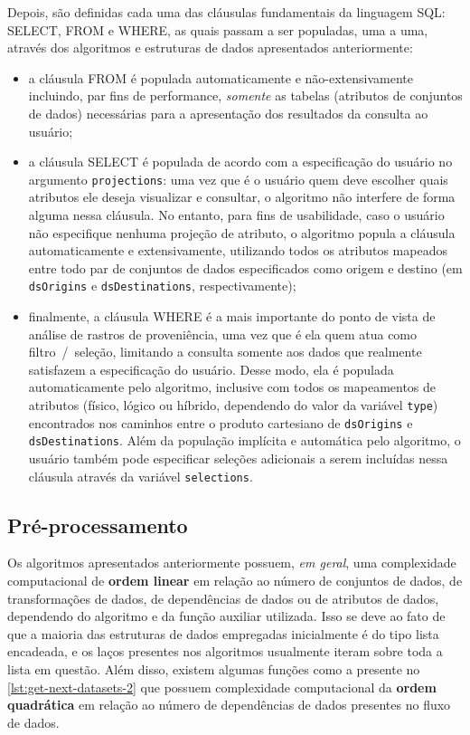 Depois, são definidas cada uma das cláusulas fundamentais da linguagem SQL: \textsc{SELECT}, \textsc{FROM} e \textsc{WHERE}, as quais passam a ser populadas, uma a uma, através dos algoritmos e estruturas de dados apresentados anteriormente:

\begin{itemize}
    \item a cláusula \textsc{FROM} é populada automaticamente e não-extensivamente incluindo, par fins de performance, \emph{somente} as tabelas (atributos de conjuntos de dados) necessárias para a apresentação dos resultados da consulta ao usuário;
    \item a cláusula \textsc{SELECT} é populada de acordo com a especificação do usuário no argumento \texttt{projections}: uma vez que é o usuário quem deve escolher quais atributos ele deseja visualizar e consultar, o algoritmo não interfere de forma alguma nessa cláusula. No entanto, para fins de usabilidade, caso o usuário não especifique nenhuma projeção de atributo, o algoritmo popula a cláusula automaticamente e extensivamente, utilizando todos os atributos mapeados entre todo par de conjuntos de dados especificados como origem e destino (em \texttt{dsOrigins} e \texttt{dsDestinations}, respectivamente);
    \item finalmente, a cláusula \textsc{WHERE} é a mais importante do ponto de vista de análise de rastros de proveniência, uma vez que é ela quem atua como filtro~/~seleção, limitando a consulta somente aos dados que realmente satisfazem a especificação do usuário. Desse modo, ela é populada automaticamente pelo algoritmo, inclusive com todos os mapeamentos de atributos (físico, lógico ou híbrido, dependendo do valor da variável \texttt{type}) encontrados nos caminhos entre o produto cartesiano de \texttt{dsOrigins} e \texttt{dsDestinations}. Além da população implícita e automática pelo algoritmo, o usuário também pode especificar seleções adicionais a serem incluídas nessa cláusula através da variável \texttt{selections}.
\end{itemize}

\subsection{Pré-processamento}%
\label{subsec:preprocessamento}

Os algoritmos apresentados anteriormente possuem, \emph{em geral}, uma complexidade computacional de \textbf{ordem linear} em relação ao número de conjuntos de dados, de transformações de dados, de dependências de dados ou de atributos de dados, dependendo do algoritmo e da função auxiliar utilizada. Isso se deve ao fato de que a maioria das estruturas de dados empregadas inicialmente é do tipo lista encadeada, e os laços presentes nos algoritmos usualmente iteram sobre toda a lista em questão. Além disso, existem algumas funções como a presente no \autoref{lst:get-next-datasets-2} que possuem complexidade computacional da \textbf{ordem quadrática} em relação ao número de dependências de dados presentes no fluxo de dados.

